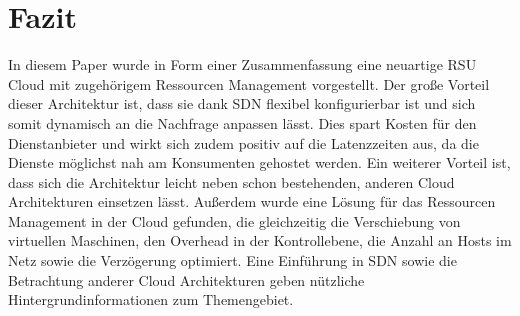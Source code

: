 \documentclass[conference]{IEEEtran}
\begin{document}
\section{Fazit}

In diesem Paper wurde in Form einer Zusammenfassung eine neuartige RSU Cloud mit zugehörigem Ressourcen Management vorgestellt. Der große Vorteil dieser Architektur ist, dass sie dank SDN flexibel konfigurierbar ist und sich somit dynamisch an die Nachfrage anpassen lässt. Dies spart Kosten für den Dienstanbieter und wirkt sich zudem positiv auf die Latenzzeiten aus, da die Dienste möglichst nah am Konsumenten gehostet werden. Ein weiterer Vorteil ist, dass sich die Architektur leicht neben schon bestehenden, anderen Cloud Architekturen einsetzen lässt.
Außerdem wurde eine Lösung für das Ressourcen Management in der Cloud gefunden, die gleichzeitig die Verschiebung von virtuellen Maschinen, den Overhead in der Kontrollebene, die Anzahl an Hosts im Netz sowie die Verzögerung optimiert.
Eine Einführung in SDN sowie die Betrachtung anderer Cloud Architekturen geben nützliche Hintergrundinformationen zum Themengebiet.




%
%
%

\newpage
\end{document}
